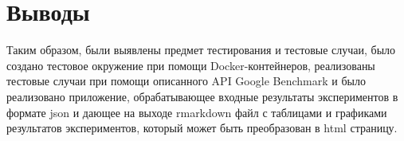 \section{Выводы}
	Таким образом, были выявлены предмет тестирования и тестовые случаи, было создано тестовое окружение при помощи Docker-контейнеров, реализованы тестовые случаи при помощи описанного API Google Benchmark и было реализовано приложение, обрабатывающее входные результаты экспериментов в формате json и дающее на выходе rmarkdown файл с таблицами и графиками результатов экспериментов, который может быть преобразован в html страницу.

